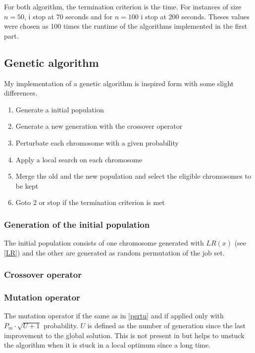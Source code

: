 \documentclass[a4paper]{article}
\begin{document}
For both algorithm, the termination criterion is the time. For instances of size $n=50$, i stop at 70 seconds and for $n=100$ i stop at 200 seconds. Theses values were chosen as 100 times the runtime of the algorithms implemented in the first part.


\subsection{Genetic algorithm}

My implementation of a genetic algorithm is inspired form \cite{zhang2009} with some slight differences.

\begin{enumerate}
    \item Generate a initial population
    \item Generate a new generation with the crossover operator
    \item Perturbate each chromosome with a given probability
    \item Apply a local search on each chromosome
    \item Merge the old and the new population and select the eligible chromosomes to be kept
    \item Goto 2 or stop if the termination criterion is met
\end{enumerate}

\subsubsection{Generation of the initial population}

The initial population consists of one chromosome generated with $LR(x)$ (see \ref{LR}) and the other
are generated as random permutation of the job set.

\subsubsection{Crossover operator}


\subsubsection{Mutation operator}

The mutation operator if the same as in \ref{pertu} and if applied only with $P_m \cdot \sqrt{U + 1}$ probability.
$U$ is defined as the number of generation since the last improvement to the global solution. This is not present in \cite{zhang2009} but helps to unstuck the algorithm when it is stuck in a local optimum since a long time.
\end{document}
